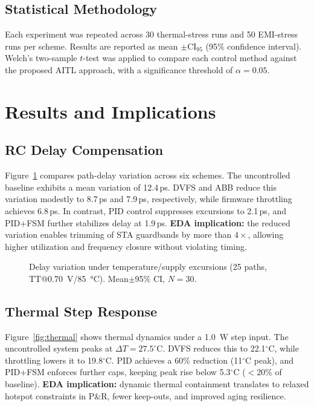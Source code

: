 \documentclass[conference]{IEEEtran}
\newcommand{\CI}{\mathrm{CI}_{95}}
\begin{document}
\subsection{Statistical Methodology}
Each experiment was repeated across 30 thermal-stress runs and 50 EMI-stress runs per scheme. Results are reported as mean $\pm \CI$ (95\% confidence interval). Welch’s two-sample $t$-test was applied to compare each control method against the proposed AITL approach, with a significance threshold of $\alpha=0.05$.

\section{Results and Implications}

\subsection{RC Delay Compensation}
Figure~\ref{fig:rc} compares path-delay variation across six schemes.  
The uncontrolled baseline exhibits a mean variation of 12.4\,ps. DVFS and ABB reduce this variation modestly to 8.7\,ps and 7.9\,ps, respectively, while firmware throttling achieves 6.8\,ps. In contrast, PID control suppresses excursions to 2.1\,ps, and PID+FSM further stabilizes delay at 1.9\,ps.  
\textbf{EDA implication:} the reduced variation enables trimming of STA guardbands by more than $4\times$, allowing higher utilization and frequency closure without violating timing.

\begin{figure}[t]
\centering
{}
\caption{Delay variation under temperature/supply excursions (25 paths, TT@\SI{0.70}{V}/\SI{85}{\celsius}). Mean$\pm$95\% CI, $N=30$.}
\label{fig:rc}
\end{figure}

\subsection{Thermal Step Response}
Figure~\ref{fig:thermal} shows thermal dynamics under a \SI{1.0}{W} step input.  
The uncontrolled system peaks at $\Delta T=27.5^{\circ}$C. DVFS reduces this to 22.1$^{\circ}$C, while throttling lowers it to 19.8$^{\circ}$C. PID achieves a 60\% reduction (11$^{\circ}$C peak), and PID+FSM enforces further caps, keeping peak rise below 5.3$^{\circ}$C ($<20\%$ of baseline).  
\textbf{EDA implication:} dynamic thermal containment translates to relaxed hotspot constraints in P\&R, fewer keep-outs, and improved aging resilience.
\end{document}
